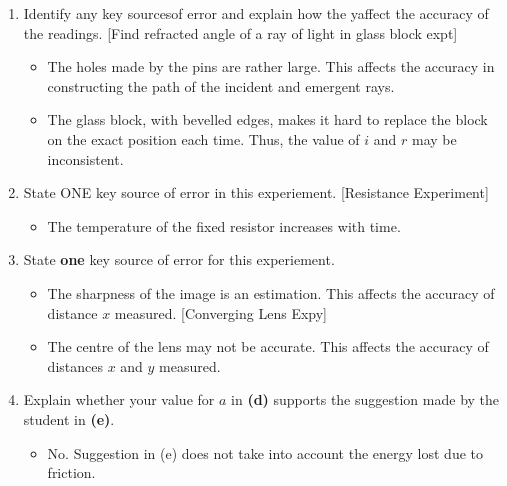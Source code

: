 \documentclass[oneside]{book}
\begin{document}
\begin{enumerate}
\begin{itemize}[label=\(\circ\)]
    \end{itemize}
    \item Identify any key sourcesof error and explain how the yaffect the accuracy of the readings. \scriptsize [Find refracted angle of a ray of light in glass block expt] \footnotesize
    \begin{itemize}[label=\(\circ\)]
        \item The holes made by the pins are rather large. This affects the accuracy in constructing the path of the incident and emergent rays.
        \item The glass block, with bevelled edges, makes it hard to replace the block on the exact position each time. Thus, the value of \(i\) and \(r\) may be inconsistent.
    \end{itemize} 
    \item State ONE key source of error in this experiement. \scriptsize [Resistance Experiment] \footnotesize\\
    \begin{itemize}[label=\(\circ\)]
        \item The temperature of the fixed resistor increases with time.
    \end{itemize}
    \item State \textbf{one} key source of error for this experiement.\\
    \begin{itemize}[label=\(\circ\)]
        \item The sharpness of the image is an estimation. This affects the accuracy of distance \(x\) measured. \scriptsize [Converging Lens Expy] \footnotesize
        \item The centre of the lens may not be accurate. This affects the accuracy of distances \(x\) and \(y\) measured.
    \end{itemize}
    \item  Explain whether your value for \(a\) in \textbf{(d)}
    supports the suggestion made by the student in \textbf{(e)}.\\
    \begin{itemize}[label=\(\circ\)]
        \item No. Suggestion in (e) does not take into account the energy lost due to friction.
    \end{itemize}
\end{enumerate}
\end{document}
